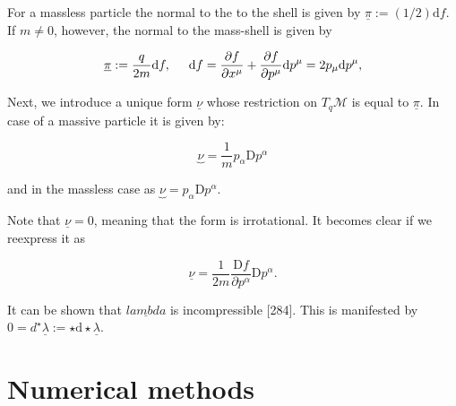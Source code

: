 \documentclass[11pt,a4paper,headinclude=true,DIV=14,BCOR=8mm,chapterprefix,listof=totoc,twoside,openright,abstracton]{scrbook}
\begin{document}
For a massless particle the normal to the to the shell is given by $\underline{\pi}:=(1/2)\text{d}f$. If $m\neq 0$, however, the normal to the mass-shell is given by

\begin{equation}
    \underline{\pi}:=\frac{q}{2m}\text{d}f, \hspace{5mm} \text{d}f = \frac{\partial f}{\partial x^{\mu}} + \frac{\partial f}{\partial p^{\mu}}\text{d}p^{\mu} = 2p_{\mu}\text{d}p^{\mu},
\end{equation}

Next, we introduce a unique form $\underline{\nu}$ whose restriction on $T_q\mathcal{M}$ is equal to $\underline{\pi}$. In case of a massive particle it is given by:

\begin{equation}
    \underbrace{\nu} = \frac{1}{m}p_{\alpha}\text{D}p^{\alpha}
\end{equation} 

and in the massless case as $\underbrace{\nu} = p_{\alpha}\text{D}p^{\alpha}$. 

Note that $\underline{\nu} = 0$, meaning that the form is irrotational. It becomes clear if we reexpress it as 

\begin{equation}
    \underline{\nu} = \frac{1}{2m}\frac{\text{D}f}{\partial p^{\alpha}}\text{D}p^{\alpha}.
\end{equation} 

It can be shown that $\underline{lambda}$ is incompressible [284]\cite{Sasaki:1958}. This is manifested by $0=d^{\star}\underline{\lambda}:=\star\text{d}\star\underline{\lambda}$.







\chapter{Numerical methods}
\label{chapter:num_methods}


\newpage


\end{document}

